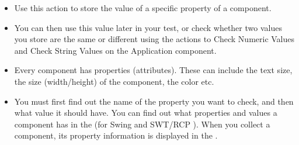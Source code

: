 
\begin{itemize}
\item Use this action to store the value of a specific property of a component.
\item You can then use this value later in your test, or check whether two values you store are the same or different using the actions to Check Numeric Values and Check String Values on the Application component. 
\item Every component has properties (attributes). These can include the text size, the size (width/height) of the component, the color etc.
\item You must first find out the name of the property you want to check, and then what value it should have. You can find out what properties and values a component has in the \gdomm{} (for Swing and SWT/RCP \gdauts{}). When you collect a component, its property information is displayed in the \gdpropview{}. 
\end{itemize}
